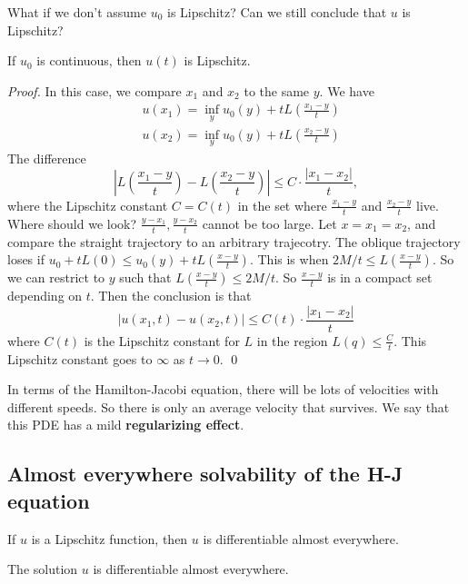 What if we don't assume $u_0$ is Lipschitz? Can we still conclude that $u$ is Lipschitz? 

\begin{proposition}
    If $u_0$ is continuous, then $u(t)$ is Lipschitz.
\end{proposition}
\begin{proof}
    In this case, we compare $x_1$ and $x_2$ to the same $y$. We have 
    \[
        \begin{aligned}
            &u\left(x_{1}\right)=\inf _{y} u_{0}(y)+tL\left(\frac{x_{1}-y}{t}\right) \\
            &u\left(x_{2}\right)=\inf _{y} u_{0}(y)+tL\left(\frac{x_{2}-y}{t}\right)
            \end{aligned}
    \]
    The difference
    \[
        \left|L\left(\frac{x_{1}-y}{t}\right)-L\left(\frac{x_{2}-y}{t}\right)\right| \leq C \cdot \frac{\left|x_{1}-x_{2}\right|}{t},
    \]
    where the Lipschitz constant $C=C(t)$ in the set where $\frac{x_1-y}{t}$ and $\frac{x_2-y}{t}$ live. 
    Where should we look? $\frac{y-x_1}{t}, \frac{y-x_2}{t}$ cannot be too large. Let $x=x_1=x_2$, and compare the straight trajectory to an arbitrary trajecotry. The oblique trajectory loses if $u_0+tL(0) \le u_0(y)+ tL(\frac{x-y}{t})$. This is when $2M/t \le L(\frac{x-y}{t})$. So we can restrict to $y$ such that $L(\frac{x-y}{t})\le 2M/t$. So $\frac{x-y}{t}$ is in a compact set depending on $t$. Then the conclusion is that 
    $$
\left|u\left(x_{1}, t\right)-u\left(x_{2}, t\right)\right| \leq C(t) \cdot \frac{\left|x_{1}-x_{2}\right|}{t}
$$
where $C(t)$ is the Lipschitz constant for $L$ in the region $L(q) \leq \frac{C}{t} .$ This Lipschitz constant goes to $\infty$ as $t \rightarrow 0$. \qed 
\end{proof}

In terms of the Hamilton-Jacobi equation, there will be lots of velocities with different speeds. So there is only an average velocity that survives. We say that this PDE has a mild \textbf{regularizing effect}.

\subsection{Almost everywhere solvability of the H-J equation}
\begin{theorem}
    If $u$ is a Lipschitz function, then $u$ is differentiable almost everywhere.
\end{theorem}
\begin{corollary}
    The solution $u$ is differentiable almost everywhere.
\end{corollary}

